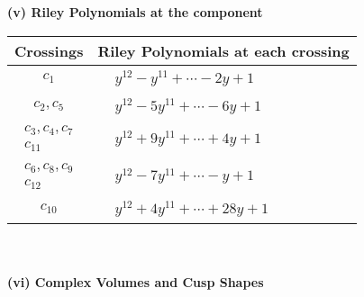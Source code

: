 \documentclass[1p]{elsarticle_modified}
\theoremstyle{definition}
\begin{document}
\newpage\renewcommand{\arraystretch}{1}
\flushleft \textbf{(v) Riley Polynomials at the component}\newline \\
\begin{tabular}{m{50pt}|m{274pt}}
Crossings & \hspace{64pt}Riley Polynomials at each crossing \\
\hline $$\begin{aligned}c_{1}\end{aligned}$$&$\begin{aligned}
&y^{12}- y^{11}+\cdots-2 y+1
\end{aligned}$\\
\hline $$\begin{aligned}c_{2},c_{5}\end{aligned}$$&$\begin{aligned}
&y^{12}-5 y^{11}+\cdots-6 y+1
\end{aligned}$\\
\hline $$\begin{aligned}c_{3},c_{4},c_{7}\\c_{11}\end{aligned}$$&$\begin{aligned}
&y^{12}+9 y^{11}+\cdots+4 y+1
\end{aligned}$\\
\hline $$\begin{aligned}c_{6},c_{8},c_{9}\\c_{12}\end{aligned}$$&$\begin{aligned}
&y^{12}-7 y^{11}+\cdots- y+1
\end{aligned}$\\
\hline $$\begin{aligned}c_{10}\end{aligned}$$&$\begin{aligned}
&y^{12}+4 y^{11}+\cdots+28 y+1
\end{aligned}$\\
\hline
\end{tabular}\\~\\
\newpage\flushleft \textbf{(vi) Complex Volumes and Cusp Shapes}
\end{document}
